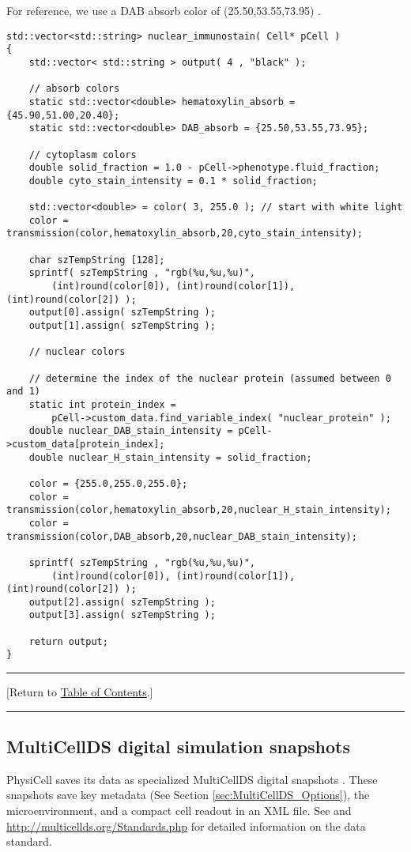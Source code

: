 \documentclass[12pt]{article}
\newcommand{\blue}[1]{\textcolor{blue}{#1}}
\newcommand{\DONE}{}%
\newcommand{\TOClink}{\begin{center}\hrule\vskip-5pt\phantom{.}\hfill[Return to \hyperlink{TOC}{Table of Contents}.]\hfill\phantom{.}\vskip3pt\hrule\end{center}}
\begin{document}
For reference, we use a DAB absorb color of 
(25.50,53.55,73.95) \cite{ref:H_and_E}. 
\begin{verbatim}
std::vector<std::string> nuclear_immunostain( Cell* pCell )
{
    std::vector< std::string > output( 4 , "black" ); 
 
    // absorb colors 
    static std::vector<double> hematoxylin_absorb = {45.90,51.00,20.40};
    static std::vector<double> DAB_absorb = {25.50,53.55,73.95};
 
    // cytoplasm colors 
    double solid_fraction = 1.0 - pCell->phenotype.fluid_fraction; 
    double cyto_stain_intensity = 0.1 * solid_fraction; 
  
    std::vector<double> = color( 3, 255.0 ); // start with white light 
    color = transmission(color,hematoxylin_absorb,20,cyto_stain_intensity);  
 
    char szTempString [128]; 
    sprintf( szTempString , "rgb(%u,%u,%u)", 
        (int)round(color[0]), (int)round(color[1]), (int)round(color[2]) ); 
    output[0].assign( szTempString ); 
    output[1].assign( szTempString ); 
 
    // nuclear colors 

    // determine the index of the nuclear protein (assumed between 0 and 1)
    static int protein_index = 
        pCell->custom_data.find_variable_index( "nuclear_protein" ); 
    double nuclear_DAB_stain_intensity = pCell->custom_data[protein_index]; 
    double nuclear_H_stain_intensity = solid_fraction; 

    color = {255.0,255.0,255.0}; 
    color = transmission(color,hematoxylin_absorb,20,nuclear_H_stain_intensity);
    color = transmission(color,DAB_absorb,20,nuclear_DAB_stain_intensity);
 
    sprintf( szTempString , "rgb(%u,%u,%u)", 
        (int)round(color[0]), (int)round(color[1]), (int)round(color[2]) ); 
    output[2].assign( szTempString ); 
    output[3].assign( szTempString ); 
 
    return output; 
}
\end{verbatim}

\TOClink

\subsection{MultiCellDS digital simulation snapshots \DONE}
PhysiCell saves its data as specialized MultiCellDS digital 
snapshots \cite{ref:MultiCellDS}. These snapshots save 
key metadata (See Section \ref{sec:MultiCellDS_Options}), 
the microenvironment, and a compact cell readout in an 
XML file. See \cite{ref:MultiCellDS} and 
\href{http://multicellds.org/Standards.php}{http://multicellds.org/Standards.php} 
for detailed information on the data standard. 
\end{document}
